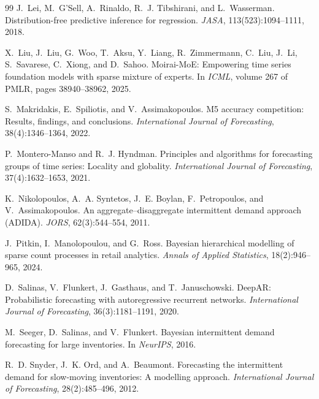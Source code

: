 \documentclass[twocolumn,10pt]{article}
\theoremstyle{definition}
\begin{document}
\begin{thebibliography}{99}
J.~Lei, M.~G'Sell, A.~Rinaldo, R.~J. Tibshirani, and L.~Wasserman.
\newblock Distribution-free predictive inference for regression.
\newblock \emph{JASA}, 113(523):1094--1111, 2018.

X.~Liu, J.~Liu, G.~Woo, T.~Aksu, Y.~Liang, R.~Zimmermann, C.~Liu,
  J.~Li, S.~Savarese, C.~Xiong, and D.~Sahoo.
\newblock Moirai-MoE: Empowering time series foundation models with sparse
  mixture of experts.
\newblock In \emph{ICML}, volume 267 of PMLR, pages 38940--38962, 2025.

S.~Makridakis, E.~Spiliotis, and V.~Assimakopoulos.
\newblock M5 accuracy competition: Results, findings, and conclusions.
\newblock \emph{International Journal of Forecasting}, 38(4):1346--1364, 2022.

P.~Montero-Manso and R.~J. Hyndman.
\newblock Principles and algorithms for forecasting groups of time
  series: Locality and globality.
\newblock \emph{International Journal of Forecasting}, 37(4):1632--1653,
  2021.

K.~Nikolopoulos, A.~A. Syntetos, J.~E. Boylan, F.~Petropoulos, and
  V.~Assimakopoulos.
\newblock An aggregate--disaggregate intermittent demand approach (ADIDA).
\newblock \emph{JORS}, 62(3):544--554, 2011.

J.~Pitkin, I.~Manolopoulou, and G.~Ross.
\newblock Bayesian hierarchical modelling of sparse count processes in
  retail analytics.
\newblock \emph{Annals of Applied Statistics}, 18(2):946--965, 2024.

D.~Salinas, V.~Flunkert, J.~Gasthaus, and T.~Januschowski.
\newblock DeepAR: Probabilistic forecasting with autoregressive recurrent
  networks.
\newblock \emph{International Journal of Forecasting}, 36(3):1181--1191, 2020.

M.~Seeger, D.~Salinas, and V.~Flunkert.
\newblock Bayesian intermittent demand forecasting for large inventories.
\newblock In \emph{NeurIPS}, 2016.

R.~D. Snyder, J.~K. Ord, and A.~Beaumont.
\newblock Forecasting the intermittent demand for slow-moving
  inventories: A modelling approach.
\newblock \emph{International Journal of Forecasting}, 28(2):485--496,
  2012.


\end{thebibliography}
\end{document}
